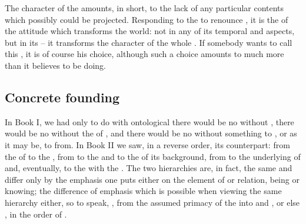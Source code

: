The  character of the  amounts, in short, to the lack of
any particular contents which possibly could be projected.  Responding to the
 to renounce , it is the  of the attitude
which transforms the world: not in any of its temporal and  aspects,
but in its  -- it transforms the character of the whole
.  If somebody wants to call this , it is of course
his choice, although such a choice amounts to much more than it believes to be
doing.


\subsection{Concrete founding}\label{sub:concrete}

\pa In Book I, we had only to do with ontological  there would be
no  without , there would be no 
without the  of , and there would be no
 without something to , or as it may be, to
 from.
%
In Book II we saw, in a reverse order, its  counterpart:
from the  of  to the , from  to the  and to the
 of its  background, from  to the
underlying  of  and, eventually, to the
 with the .
The two hierarchies are, in fact, the same and differ only by the emphasis one
puts either on the element of  or relation, being or knowing;
the difference of emphasis which is possible when viewing the same hierarchy
either, so to speak, , from the assumed primacy of the
 into  and , or else , in
the order of .

